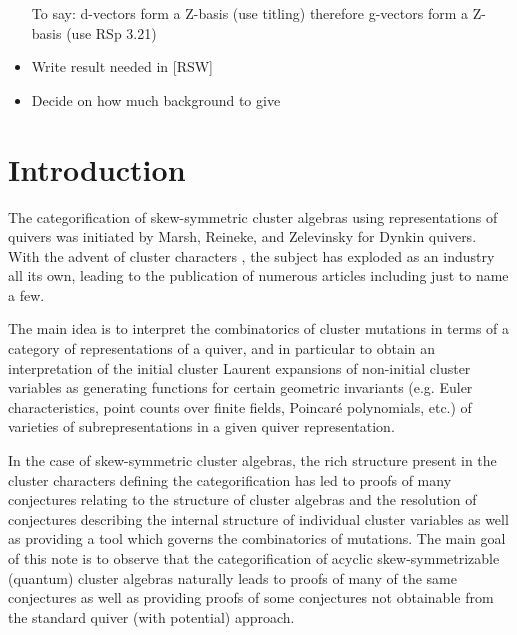\documentclass{amsart}
\begin{document}
\begin{itemize}
To say:
	d-vectors form a Z-basis (use titling)
	therefore g-vectors form a Z-basis (use RSp 3.21)



    \item
      Write result needed in [RSW]

    \item
      Decide on how much background to give

  \end{itemize}

  \section{Introduction}
  The categorification of skew-symmetric cluster algebras using representations of quivers was initiated by Marsh, Reineke, and Zelevinsky \cite{marsh-reineke-zelevinsky} for Dynkin quivers.  
  With the advent of cluster characters \cite{caldero-chapoton}, the subject has exploded as an industry all its own, leading to the publication of numerous articles including \cite{caldero-chapoton-schiffler,buan-marsh-reineke-reiten-todorov,derksen-weyman-zelevinsky,geiss-leclerc-schroer,caldero-keller,caldero-keller2,plamondon,palu,rupel1,qin,rupel2} just to name a few.  

  The main idea is to interpret the combinatorics of cluster mutations in terms of a category of representations of a quiver, and in particular to obtain an interpretation of the initial cluster Laurent expansions of non-initial cluster variables as generating functions for certain geometric invariants (e.g. Euler characteristics, point counts over finite fields, Poincar\'e polynomials, etc.) of varieties of subrepresentations in a given quiver representation.
  
  In the case of skew-symmetric cluster algebras, the rich structure present in the cluster characters defining the categorification has led to proofs of many conjectures relating to the structure of cluster algebras \cite{cerulliirelli-keller-labardinifragoso-plamondon} and the resolution of conjectures describing the internal structure of individual cluster variables as well as providing a tool which governs the combinatorics of mutations.
  The main goal of this note is to observe that the categorification of acyclic skew-symmetrizable (quantum) cluster algebras \cite{rupel1,rupel2} naturally leads to proofs of many of the same conjectures as well as providing proofs of some conjectures not obtainable from the standard quiver (with potential) approach.  
\end{document}

